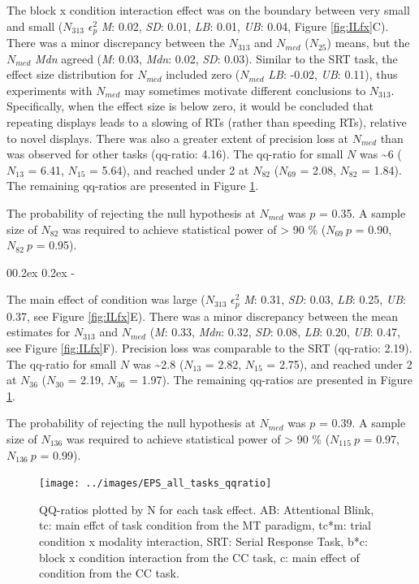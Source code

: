 \documentclass[
  man]{apa6}
\makeatletter
\let\oldsubparagraph\subparagraph
\renewcommand{\subparagraph}[1]{\oldsubparagraph{#1}\mbox{}}
\renewcommand{\subparagraph}[1]{\@startsection{subparagraph}{5}{1em}%
  {0\baselineskip \@plus 0.2ex \@minus 0.2ex}%
  {-\z@\relax}%
  {\normalfont\normalsize\itshape\hspace{\parindent}{#1}\textit{\addperi}}{\relax}}
\makeatother
\begin{document}
The block x condition interaction effect was on the boundary between very small and small (\(N_{313}\) \(\epsilon_{p}^2\) \emph{M}: 0.02, \emph{SD}: 0.01, \emph{LB}: 0.01, \emph{UB}: 0.04, Figure \ref{fig:ILfx}C). There was a minor discrepancy between the \(N_{313}\) and \(N_{med}\) (\(N_{25}\)) means, but the \(N_{med}\) \emph{Mdn} agreed (\emph{M}: 0.03, \emph{Mdn}: 0.02, \emph{SD}: 0.03). Similar to the SRT task, the effect size distribution for \(N_{med}\) included zero (\(N_{med}\) \emph{LB}: -0.02, \emph{UB}: 0.11), thus experiments with \(N_{med}\) may sometimes motivate different conclusions to \(N_{313}\). Specifically, when the effect size is below zero, it would be concluded that repeating displays leads to a slowing of RTs (rather than speeding RTs), relative to novel displays. There was also a greater extent of precision loss at \(N_{med}\) than was observed for other tasks (qq-ratio: 4.16). The qq-ratio for small \(N\) was \textasciitilde6 (\(N_{13}\) = 6.41, \(N_{15}\) = 5.64), and reached under 2 at \(N_{82}\) (\(N_{69}\) = 2.08, \(N_{82}\) = 1.84). The remaining qq-ratios are presented in Figure \ref{fig:fxqq}.

The probability of rejecting the null hypothesis at \(N_{med}\) was \(p\) = 0.35. A sample size of \(N_{82}\) was required to achieve statistical power of \textgreater{} 90 \% (\(N_{69}\ p\) = 0.90, \(N_{82}\ p\) = 0.95).

\hypertarget{main-effect-of-condition}{%
\subparagraph{Main Effect of Condition}\label{main-effect-of-condition}}

The main effect of condition was large (\(N_{313}\) \(\epsilon_{p}^2\) \emph{M}: 0.31, \emph{SD}: 0.03, \emph{LB}: 0.25, \emph{UB}: 0.37, see Figure \ref{fig:ILfx}E). There was a minor discrepancy between the mean estimates for \(N_{313}\) and \(N_{med}\) (\emph{M}: 0.33, \emph{Mdn}: 0.32, \emph{SD}: 0.08, \emph{LB}: 0.20, \emph{UB}: 0.47, see Figure \ref{fig:ILfx}F). Precision loss was comparable to the SRT (qq-ratio: 2.19). The qq-ratio for small \(N\) was \textasciitilde2.8 (\(N_{13}\) = 2.82, \(N_{15}\) = 2.75), and reached under 2 at \(N_{36}\) (\(N_{30}\) = 2.19, \(N_{36}\) = 1.97). The remaining qq-ratios are presented in Figure \ref{fig:fxqq}.

The probability of rejecting the null hypothesis at \(N_{med}\) was \(p\) = 0.39. A sample size of \(N_{136}\) was required to achieve statistical power of \textgreater{} 90 \% (\(N_{115}\ p\) = 0.97, \(N_{136}\ p\) = 0.99).

\begin{figure}

{\centering \texttt{[image: ../images/EPS\_all\_tasks\_qqratio]} 

}

\caption{QQ-ratios plotted by N for each task effect. AB: Attentional Blink, tc: main effct of task condition from the MT paradigm, tc*m: trial condition x modality interaction, SRT: Serial Response Task, b*c: block x condition interaction from the CC task, c: main effect of condition from the CC task.}\label{fig:fxqq}
\end{figure}
\end{document}
